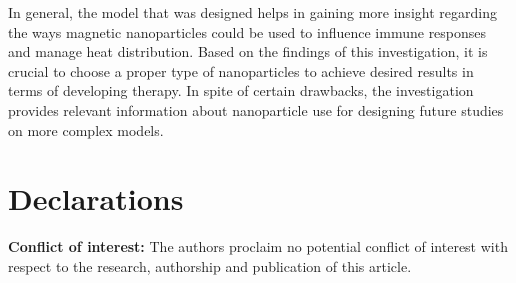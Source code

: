 \documentclass[10pt]{NSP1}
\begin{document}
	In general, the model that was designed helps in gaining more insight regarding the ways magnetic nanoparticles could be used to influence immune responses and manage heat distribution. Based on the findings of this investigation, it is crucial to choose a proper type of nanoparticles to achieve desired results in terms of developing therapy. In spite of certain drawbacks, the investigation provides relevant information about nanoparticle use for designing future studies on more complex models.
	
	\section*{Declarations}  
	
	\textbf{Conflict of interest:} The authors proclaim no potential conflict of interest with respect to the research, authorship and publication of this article.
	
\end{document}
